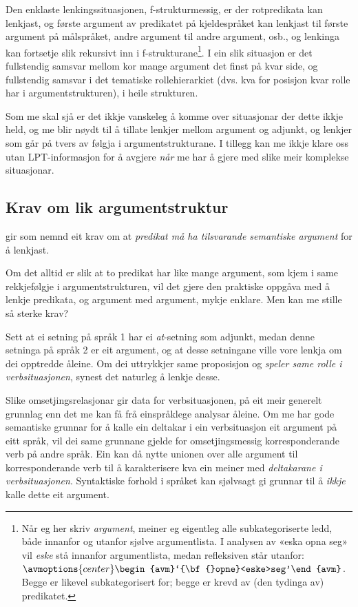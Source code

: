 \documentclass[12pt,a4paper,oneside,draft]{report}
\begin{document}
Den enklaste lenkingssituasjonen, f\hyp{}strukturmessig, er der
rotpredikata kan lenkjast, og første argument av predikatet på
kjeldespråket kan lenkjast til første argument på målspråket, andre
argument til andre argument, osb., og lenkinga kan fortsetje slik
rekursivt inn i f\hyp{}strukturane\footnote{Når eg her skriv \emph{argument}, meiner eg eigentleg alle
        subkategoriserte ledd, både innanfor og utanfor sjølve
        argumentlista. I analysen av «eska opna seg» vil \emph{eske} stå
        innanfor argumentlista, medan refleksiven står utanfor:
        ${\avmoptions{center}\begin{avm}`{\bf{}opne}<eske>seg'\end{avm}}$.
        Begge er likevel subkategorisert for; begge er krevd av (den
        tydinga av) predikatet. }. I ein slik situasjon er det fullstendig
samsvar mellom kor mange argument det finst på kvar side, og
fullstendig samsvar i det tematiske rollehierarkiet (dvs. kva for
posisjon kvar rolle har i argumentstrukturen), i heile strukturen.

Som me skal sjå er det ikkje vanskeleg å komme over situasjonar der
dette ikkje held, og me blir nøydt til å tillate lenkjer mellom
argument og adjunkt, og lenkjer som går på tvers av følgja i
argumentstrukturane. I tillegg kan me ikkje klare oss utan
LPT\hyp{}informasjon for å avgjere \emph{når} me har å gjere med slike meir
komplekse situasjonar. 
\subsection{Krav om lik argumentstruktur}
\label{sec-3.6.1}

\label{SEC:lik-argstr}

\citet{thunes2003eal} gir som nemnd eit krav om at \emph{predikat må ha tilsvarande semantiske argument} for å lenkjast.

Om det alltid er slik at to predikat har like mange argument, som kjem i
same rekkjefølgje i argumentstrukturen, vil det gjere den praktiske
oppgåva med å lenkje predikata, og argument med argument, mykje
enklare. Men kan me stille så sterke krav?

Sett at ei setning på språk 1 har ei \emph{at}-setning som adjunkt, medan
denne setninga på språk 2 er eit argument, og at desse setningane
ville vore lenkja om dei opptredde åleine. Om dei uttrykkjer same
proposisjon og \emph{speler same rolle i verbsituasjonen}, synest det
naturleg å lenkje desse.

Slike omsetjingsrelasjonar gir data for verbsituasjonen, på eit meir
 generelt grunnlag enn det me kan få frå einspråklege analysar
 åleine. Om me har gode semantiske grunnar for å kalle ein deltakar i
 ein verbsituasjon eit argument på eitt språk, vil dei same grunnane
 gjelde for omsetjingsmessig korresponderande verb på andre språk. Ein
 kan då nytte unionen over alle argument til korresponderande verb til
 å karakterisere kva ein meiner med \emph{deltakarane i  verbsituasjonen}. Syntaktiske forhold i språket kan sjølvsagt gi
 grunnar til å \emph{ikkje} kalle dette eit argument.
\end{document}
